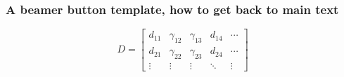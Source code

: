 \documentclass{beamer}
\begin{document}

%

%	
%



\appendix

\begin{frame}
\frametitle{A beamer button template, how to get back to main text}
\label{Steps}

\begin{equation}
D = \begin{bmatrix}
d_{11} & \gamma_{12} & \gamma_{13} & d_{14} & \cdots \\
d_{21} & \gamma_{22} & \gamma_{23} & d_{24} & \cdots \\
\vdots & \vdots & \vdots & \ddots & \vdots 
\end{bmatrix}
\end{equation}

\hyperlink{calcCBloss}{}	
\end{frame}
\end{document}
